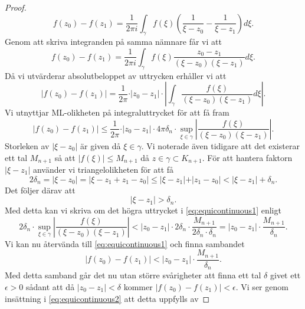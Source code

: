 \begin{proof}
	\begin{equation*}
		f(z_0) - f(z_1) = \frac{1}{2\pi i} \int_{\gamma} f(\xi) \left( \frac{1}{\xi - z_0} - \frac{1}{\xi - z_1} \right) d\xi.
	\end{equation*}
	Genom att skriva integranden på samma nämnare får vi att
	\begin{equation*}
		f(z_0) - f(z_1) = \frac{1}{2\pi i} \int_{\gamma} f(\xi) \frac{z_0 - z_1}{(\xi - z_0)(\xi - z_1)} d\xi.
	\end{equation*}
	Då vi utvärderar absolutbeloppet av uttrycken erhåller vi att
	\begin{equation*}
        \vert f(z_0) - f(z_1) \vert = \frac{1}{2\pi} \cdot \vert z_0 - z_1 \vert \cdot \left| \int_{\gamma} \frac{f(\xi)}{(\xi - z_0)(\xi - z_1)} d\xi \right|.
	\end{equation*}
	Vi utnyttjar ML-olikheten på integraluttrycket för att få fram
	\begin{equation}
		\label{eq:equicontinuous1}
		\vert f(z_0) - f(z_1) \vert \leq \frac{1}{2\pi} \cdot \vert z_0 - z_1 \vert \cdot  4 \pi \delta_n \cdot \sup_{\xi \in \gamma}\left| \frac{f(\xi)}{(\xi - z_0)(\xi - z_1)} \right|.
	\end{equation}
	Storleken av $\vert \xi - z_0 \vert$ är given då $\xi \in \gamma$. Vi noterade även tidigare att det existerar ett tal $M_{n+1}$ så att $\vert f(\xi) \vert \le M_{n+1}$ då $z \in \gamma \subset K_{n+1}$. För att hantera faktorn $\vert \xi - z_1 \vert$ använder vi triangelolikheten för att få
	\begin{equation*}
		2\delta_n = \vert \xi - z_0 \vert = \vert \xi -z_1 + z_1 - z_0 \vert \le \vert \xi - z_1 \vert + \vert z_1 - z_0 \vert < \vert \xi - z_1 \vert + \delta_n.
	\end{equation*}
	Det följer därav att
	\begin{equation*}
		\vert \xi - z_1 \vert > \delta_n.
	\end{equation*}
	Med detta kan vi skriva om det högra uttrycket i \eqref{eq:equicontinuous1} enligt
	\begin{equation*}
		2 \delta_n \cdot \sup_{\xi \in \gamma}\left| \frac{f(\xi)}{(\xi - z_0)(\xi - z_1)} \right| < \vert z_0 - z_1 \vert \cdot  2 \delta_n \cdot \frac{M_{n+1}}{2 \delta_n \cdot \delta_n } = \vert z_0 - z_1 \vert \cdot \frac{M_{n+1}}{\delta_n}.
	\end{equation*}
	Vi kan nu återvända till \eqref{eq:equicontinuous1} och finna sambandet
	\begin{equation}
		\label{eq:equicontinuous2}
		\vert f(z_0) - f(z_1) \vert < \vert z_0 - z_1 \vert \cdot \frac{M_{n+1}}{\delta_n}.
	\end{equation}
	Med detta samband går det nu utan större svårigheter att finna ett tal $\delta$ givet ett $\epsilon > 0$ sådant att då $\vert z_0 - z_1 \vert < \delta$ kommer $\vert f(z_0) - f(z_1) \vert < \epsilon$. Vi ser genom insättning i \eqref{eq:equicontinuous2} att detta uppfylls av


\end{proof}
